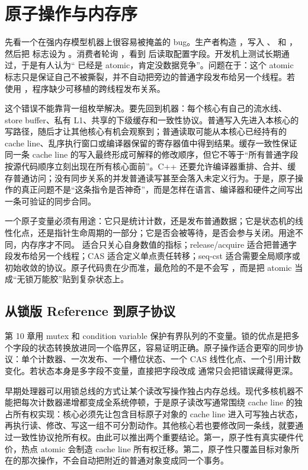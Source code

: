 \chapter{原子操作与内存序}

先看一个在强内存模型机器上很容易被掩盖的 bug。生产者构造 ，写入 、 和 ，然后把  标志设为 。消费者轮询 ，看到  后读取配置字段。开发机上测试长期通过，于是有人认为“ 已经是 atomic，肯定没数据竞争”。问题在于：这个 atomic 标志只是保证自己不被撕裂，并不自动把旁边的普通字段发布给另一个线程。若  使用 ，程序缺少可移植的跨线程发布关系。

这个错误不能靠背一组枚举解决。要先回到机器：每个核心有自己的流水线、store buffer、私有 L1、共享的下级缓存和一致性协议。普通写入先进入本核心的写路径，随后才让其他核心有机会观察到；普通读取可能从本核心已经持有的 cache line、乱序执行窗口或编译器保留的寄存器值中得到结果。缓存一致性保证同一条 cache line 的写入最终形成可解释的修改顺序，但它不等于“所有普通字段按源代码顺序立刻出现在所有核心面前”。C++ 还要允许编译器重排、合并、缓存普通访问；没有同步关系的并发普通读写甚至会落入未定义行为。于是，原子操作的真正问题不是“这条指令是否神奇”，而是怎样在语言、编译器和硬件之间写出一条可验证的同步合同。

一个原子变量必须有用途：它只是统计计数，还是发布普通数据；它是状态机的线性化点，还是指针生命周期的一部分；它是否会被等待，是否会参与关闭。用途不同，内存序才不同。 适合只关心自身数值的指标；release/acquire 适合把普通字段发布给另一个线程；CAS 适合定义单点责任转移；seq-cst 适合需要全局顺序或初始收敛的协议。原子代码贵在少而准，最危险的不是不会写 ，而是把 atomic 当成“无锁万能胶”贴到复杂状态上。

\section{从锁版 Reference 到原子协议}

第 10 章用 mutex 和 condition variable 保护有界队列的不变量。锁的优点是把多个字段的状态转换放进同一个临界区，容易证明正确。原子操作适合更窄的同步协议：单个计数器、一次发布、一个槽位状态、一个 CAS 线性化点、一个引用计数变化。若状态本身是多字段不变量，直接把字段改成  通常只会把错误藏得更深。

早期处理器可以用锁总线的方式让某个读改写操作独占内存总线。现代多核机器不能把每次计数器递增都变成全系统停顿，于是原子读改写通常围绕 cache line 的独占所有权实现：核心必须先让包含目标原子对象的 cache line 进入可写独占状态，再执行读、修改、写这一组不可分割动作。其他核心若也要修改同一条线，就要通过一致性协议抢所有权。由此可以推出两个重要结论。第一，原子性有真实硬件代价，热点 atomic 会制造 cache line 所有权迁移。第二，原子性只覆盖目标对象所在的那次操作，不会自动把附近的普通对象变成同一个事务。

